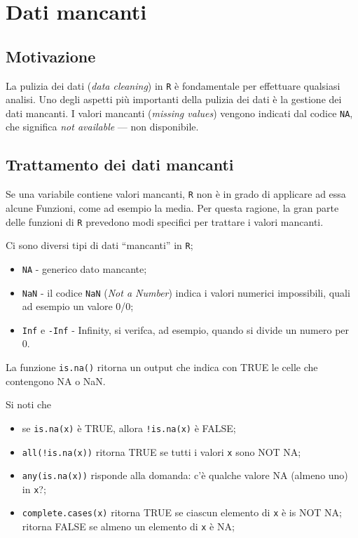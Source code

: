 \documentclass[
  11pt,
]{krantz}
\providecommand{\tightlist}{%
  \setlength{\itemsep}{0pt}\setlength{\parskip}{0pt}}
\theoremstyle{definition}
\theoremstyle{definition}
\theoremstyle{definition}
\theoremstyle{definition}
\theoremstyle{remark}
\begin{document}
\hypertarget{dati-mancanti-1}{%
\section{Dati mancanti}\label{dati-mancanti-1}}

\hypertarget{motivazione-1}{%
\subsection{Motivazione}\label{motivazione-1}}

La pulizia dei dati (\emph{data cleaning}) in \texttt{R} è fondamentale per effettuare qualsiasi analisi. Uno degli aspetti più importanti della pulizia dei dati è la gestione dei dati mancanti. I valori mancanti (\emph{missing values}) vengono indicati dal codice \texttt{NA}, che significa \emph{not available} --- non disponibile.

\hypertarget{trattamento-dei-dati-mancanti}{%
\subsection{Trattamento dei dati mancanti}\label{trattamento-dei-dati-mancanti}}

Se una variabile contiene valori mancanti, \texttt{R} non è in grado di applicare ad essa alcune Funzioni, come ad esempio la media. Per questa ragione, la gran parte delle funzioni di \texttt{R} prevedono modi specifici per trattare i valori mancanti.

Ci sono diversi tipi di dati ``mancanti'' in \texttt{R};

\begin{itemize}
\tightlist
\item
  \texttt{NA} - generico dato mancante;
\item
  \texttt{NaN} - il codice \texttt{NaN} (\emph{Not a Number}) indica i valori numerici impossibili, quali ad esempio un valore 0/0;
\item
  \texttt{Inf} e \texttt{-Inf} - Infinity, si verifca, ad esempio, quando si divide un numero per 0.
\end{itemize}

La funzione \texttt{is.na()} ritorna un output che indica con TRUE le celle che contengono NA o NaN.

Si noti che

\begin{itemize}
\tightlist
\item
  se \texttt{is.na(x)} è TRUE, allora \texttt{!is.na(x)} è FALSE;
\item
  \texttt{all(!is.na(x))} ritorna TRUE se tutti i valori \texttt{x} sono NOT NA;
\item
  \texttt{any(is.na(x))} risponde alla domanda: c'è qualche valore NA (almeno uno) in \texttt{x}?;
\item
  \texttt{complete.cases(x)} ritorna TRUE se ciascun elemento di \texttt{x} è is NOT NA; ritorna FALSE se almeno un elemento di \texttt{x} è NA;
\end{itemize}
\end{document}
